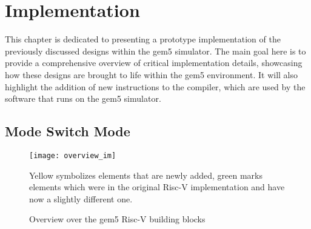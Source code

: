 \chapter{Implementation}
This chapter is dedicated to presenting a prototype implementation of the
previously discussed designs within the gem5 simulator. The main goal here is to
provide a comprehensive overview of critical implementation details, showcasing
how these designs are brought to life within the gem5 environment. It will also
highlight the addition of new instructions to the compiler, which are used by
the software that runs on the gem5 simulator. 

\section{Mode Switch Mode}

\begin{figure}[h]
    \centering
    \texttt{[image: overview\_im]}
    \captionsetup{justification=centering}
    \caption{Overview over the gem5 Risc-V building blocks}
            Yellow symbolizes elements that are newly added, green marks
            elements which were in the original Risc-V implementation and have
            now a slightly different one. 
    \label{fig:overview_im}
\end{figure}

